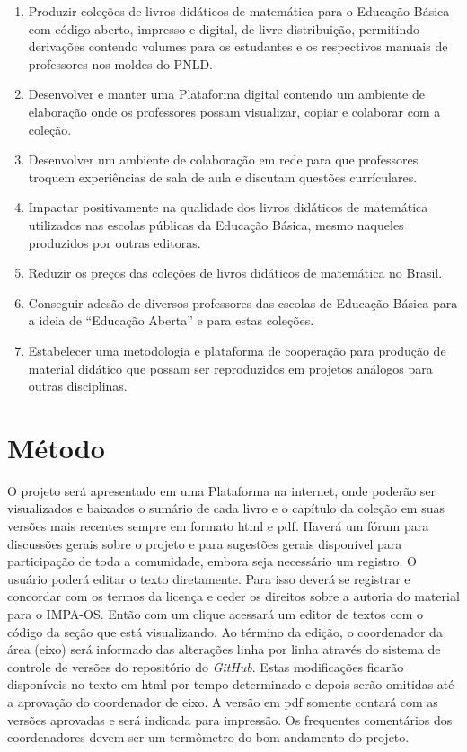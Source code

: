 \documentclass[10 pt]{article}
\begin{document}
\begin{enumerate} [\quad a)] %
  \item     Produzir coleções de livros didáticos de matemática para o Educação Básica com código aberto, impresso e digital, de livre distribuição, permitindo derivações contendo volumes para os estudantes e os respectivos manuais de professores nos moldes do PNLD.
  \item     Desenvolver e manter uma Plataforma digital contendo um ambiente de elaboração onde os professores possam visualizar, copiar e colaborar com a coleção.
  \item Desenvolver um ambiente de colaboração em rede para que professores troquem experiências de sala de aula e discutam questões currículares.
  \item     Impactar positivamente na qualidade dos livros didáticos de matemática utilizados nas escolas públicas da Educação  Básica, mesmo naqueles produzidos por outras editoras.
  \item     Reduzir os preços das coleções de livros didáticos de matemática no Brasil.
  \item     Conseguir adesão de diversos professores das escolas de Educação Básica para a ideia de ``Educação Aberta'' e para estas coleções.
  \item     Estabelecer uma metodologia e plataforma de cooperação para produção de material didático que possam ser reproduzidos em projetos análogos para outras disciplinas.
\end{enumerate} %



\section{Método}

O projeto será apresentado em uma Plataforma na internet, onde poderão ser visualizados e baixados o sumário de cada livro e o capítulo da coleção em suas versões mais recentes sempre em formato html e pdf.
Haverá um fórum para discussões gerais sobre o projeto e para sugestões gerais disponível para participação de toda a comunidade, embora seja necessário um registro.
O usuário poderá editar o texto diretamente.
Para isso deverá se registrar e concordar com os termos da licença e ceder os direitos sobre a autoria do material para o IMPA-OS.
Então com um clique acessará um editor de textos com o código da seção que está visualizando.
Ao término da edição, o coordenador da área (eixo) será informado das alterações linha por linha através do sistema de controle de versões do repositório do  {\it GitHub}.
Estas modificações ficarão disponíveis no texto em html por tempo determinado e depois serão omitidas até a aprovação do coordenador de eixo. 
A versão em pdf somente contará com as versões aprovadas e será indicada para impressão.
Os frequentes comentários dos coordenadores devem ser um termômetro do bom andamento do projeto.
\end{document}
